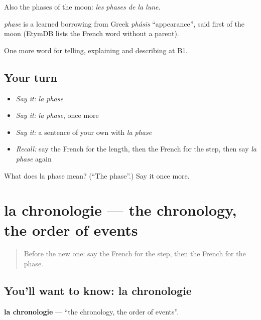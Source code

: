 Also the phases of the moon: \emph{les phases de la lune}.

\begin{cousinweb}
\emph{phase} is a learned borrowing from Greek \emph{phásis} \textquotedblleft{}appearance\textquotedblright{}, said first of the moon (EtymDB lists the French word without a parent).
\end{cousinweb}

\begin{grammarlens}[title={What you've built}]
One more word for telling, explaining and describing at B1.
\end{grammarlens}

\subsection*{Your turn}
\begin{itemize}
\raggedright
  \item \emph{Say it:} \emph{la phase}
  \item \emph{Say it:} \emph{la phase}, once more
  \item \emph{Say it:} a sentence of your own with \emph{la phase}
  \item \emph{Recall:} say the French for the length, then the French for the step, then say \emph{la phase} again
\end{itemize}

\begin{tcolorbox}[breakable,colback=teal!4,colframe=teal!35!black,title={Before you move on}]
What does la phase mean? (\textquotedblleft{}The phase\textquotedblright{}.) Say it once more.
\end{tcolorbox}
\section[la chronologie]{la chronologie — the chronology, the order of events}

\label{lesson:FR-C277-chronologie}



\begin{quote}
Before the new one: say the French for the step, then the French for the phase.
\end{quote}

\subsection*{You'll want to know: la chronologie}
\textbf{la chronologie} — \textquotedblleft{}the chronology, the order of events\textquotedblright{}.

